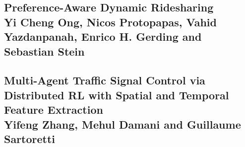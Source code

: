 \documentclass[a4paper,11pt]{article}
\begin{document}
 \subsection{Preference-Aware Dynamic Ridesharing \\ Yi Cheng Ong, Nicos Protopapas, Vahid Yazdanpanah, Enrico H. Gerding and Sebastian Stein}
 
 
 \subsection{Multi-Agent Traffic Signal Control via Distributed RL with Spatial and Temporal Feature Extraction \\ Yifeng Zhang, Mehul Damani and Guillaume Sartoretti}
 
 
\end{document}
